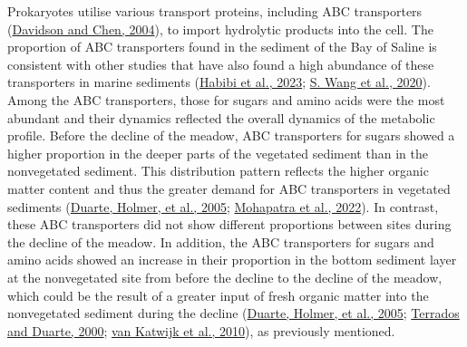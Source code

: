 \documentclass[
  12 pt,
]{book}
\begin{document}
Prokaryotes utilise various transport proteins, including ABC transporters (\protect\hyperlink{ref-Davidson2004}{Davidson and Chen, 2004}), to import hydrolytic products into the cell. The proportion of ABC transporters found in the sediment of the Bay of Saline is consistent with other studies that have also found a high abundance of these transporters in marine sediments (\protect\hyperlink{ref-Habibi2023}{Habibi et al., 2023}; \protect\hyperlink{ref-Wang2020a}{S. Wang et al., 2020}). Among the ABC transporters, those for sugars and amino acids were the most abundant and their dynamics reflected the overall dynamics of the metabolic profile. Before the decline of the meadow, ABC transporters for sugars showed a higher proportion in the deeper parts of the vegetated sediment than in the nonvegetated sediment. This distribution pattern reflects the higher organic matter content and thus the greater demand for ABC transporters in vegetated sediments (\protect\hyperlink{ref-Duarte2005}{Duarte, Holmer, et al., 2005}; \protect\hyperlink{ref-Mohapatra2022}{Mohapatra et al., 2022}). In contrast, these ABC transporters did not show different proportions between sites during the decline of the meadow. In addition, the ABC transporters for sugars and amino acids showed an increase in their proportion in the bottom sediment layer at the nonvegetated site from before the decline to the decline of the meadow, which could be the result of a greater input of fresh organic matter into the nonvegetated sediment during the decline (\protect\hyperlink{ref-Duarte2005}{Duarte, Holmer, et al., 2005}; \protect\hyperlink{ref-Terrados2000}{Terrados and Duarte, 2000}; \protect\hyperlink{ref-vanKatwijk2010}{van Katwijk et al., 2010}), as previously mentioned.
\end{document}
